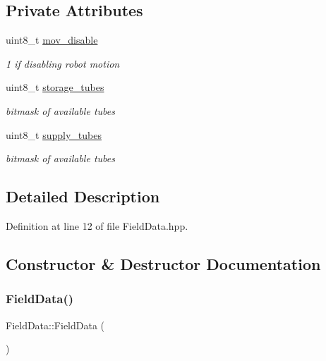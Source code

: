 \subsection*{Private Attributes}
\begin{DoxyCompactItemize}
\item 
uint8\+\_\+t \hyperlink{class_field_data_a82ed3c6771df262aae42cb332ccc7d0c}{mov\+\_\+disable}
\begin{DoxyCompactList}\small\item\em 1 if disabling robot motion \end{DoxyCompactList}\item 
uint8\+\_\+t \hyperlink{class_field_data_a215428022f049a8f0b6702783291b636}{storage\+\_\+tubes}
\begin{DoxyCompactList}\small\item\em bitmask of available tubes \end{DoxyCompactList}\item 
uint8\+\_\+t \hyperlink{class_field_data_a2ac91dcec791870370d578c276993690}{supply\+\_\+tubes}
\begin{DoxyCompactList}\small\item\em bitmask of available tubes \end{DoxyCompactList}\end{DoxyCompactItemize}


\subsection{Detailed Description}


Definition at line 12 of file Field\+Data.\+hpp.



\subsection{Constructor \& Destructor Documentation}
\mbox{\label{class_field_data_a53bb54569b22ffac4bce51a72e949d3d}} 
\subsubsection{\texorpdfstring{Field\+Data()}{FieldData()}}
{\footnotesize\ttfamily Field\+Data\+::\+Field\+Data (\begin{DoxyParamCaption}{ }\end{DoxyParamCaption})\hspace{0.3cm}{\ttfamily [inline]}}



